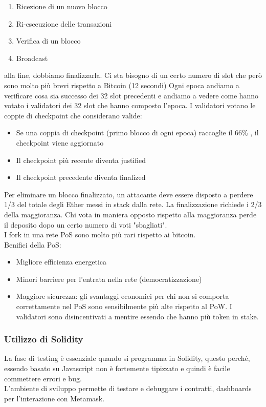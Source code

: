 \documentclass[a4paper]{article}
\begin{document}
\begin{enumerate}
    \item Ricezione di un nuovo blocco
    \item Ri-esecuzione delle transazioni
    \item Verifica di un blocco
    \item Broadcast
\end{enumerate}
alla fine, dobbiamo finalizzarla. Ci sta bisogno di un certo numero di slot che però sono molto più brevi rispetto a Bitcoin (12 secondi)
Ogni epoca andiamo a verificare cosa sia successo dei 32 slot precedenti e andiamo a vedere come hanno votato i validatori dei 32 slot che hanno composto l'epoca.
I validatori votano le coppie di checkpoint che considerano valide:
\begin{itemize}
    \item Se una coppia di checkpoint (primo blocco di ogni epoca) raccoglie il 66\% , il checkpoint viene aggiornato
    \item Il checkpoint più recente diventa justified
    \item Il checkpoint precedente diventa finalized
\end{itemize}
Per eliminare un blocco finalizzato, un attacante deve essere disposto a perdere 1/3 del totale degli Ether messi in stack dalla rete.
La finalizzazione richiede i 2/3 della maggioranza.
Chi vota in maniera opposto rispetto alla maggioranza perde il deposito dopo un certo numero di voti "sbagliati".
\\
I fork in una rete PoS sono molto più rari rispetto ai bitcoin.
\\
Benifici della PoS:
\begin{itemize}
    \item Migliore efficienza energetica
    \item Minori barriere per l'entrata nella rete (democratizzazione)
    \item Maggiore sicurezza: gli svantaggi economici per chi non si comporta correttamente nel PoS sono sensibilmente più alte rispetto al PoW. I validatori sono disincentivati a mentire essendo che hanno più token in stake.
\end{itemize}

\subsubsection{Utilizzo di Solidity}

La fase di testing è essenziale quando si programma in Solidity, questo perché, essendo basato su Javascript non è
fortemente tipizzato e quindi è facile commettere errori e bug.
\\
L'ambiente di sviluppo permette di testare e debuggare i contratti, dashboards per l'interazione con Metamask.
\end{document}
